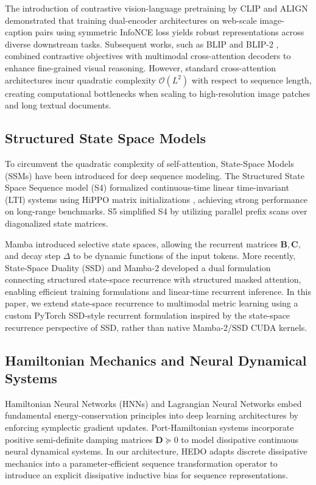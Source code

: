 \documentclass[journal]{IEEEtran}
\begin{document}
The introduction of contrastive vision-language pretraining by CLIP \cite{radford2021learning} and ALIGN \cite{jia2021scaling} demonstrated that training dual-encoder architectures on web-scale image-caption pairs using symmetric InfoNCE loss yields robust representations across diverse downstream tasks. Subsequent works, such as BLIP \cite{li2022blip} and BLIP-2 \cite{li2023blip2}, combined contrastive objectives with multimodal cross-attention decoders to enhance fine-grained visual reasoning. However, standard cross-attention architectures incur quadratic complexity $\mathcal{O}(L^2)$ with respect to sequence length, creating computational bottlenecks when scaling to high-resolution image patches and long textual documents.

\subsection{Structured State Space Models}
To circumvent the quadratic complexity of self-attention, State-Space Models (SSMs) have been introduced for deep sequence modeling. The Structured State Space Sequence model (S4) \cite{gu2021efficiently} formalized continuous-time linear time-invariant (LTI) systems using HiPPO matrix initializations \cite{gu2021efficiently}, achieving strong performance on long-range benchmarks. S5 \cite{smith2022simplified} simplified S4 by utilizing parallel prefix scans over diagonalized state matrices.

Mamba \cite{gu2023mamba} introduced selective state spaces, allowing the recurrent matrices $\mathbf{B}, \mathbf{C},$ and decay step $\Delta$ to be dynamic functions of the input tokens. More recently, State-Space Duality (SSD) and Mamba-2 \cite{dao2024transformers} developed a dual formulation connecting structured state-space recurrence with structured masked attention, enabling efficient training formulations and linear-time recurrent inference. In this paper, we extend state-space recurrence to multimodal metric learning using a custom PyTorch SSD-style recurrent formulation inspired by the state-space recurrence perspective of SSD, rather than native Mamba-2/SSD CUDA kernels.

\subsection{Hamiltonian Mechanics and Neural Dynamical Systems}
Hamiltonian Neural Networks (HNNs) \cite{greydanus2019hamiltonian} and Lagrangian Neural Networks \cite{cranmer2020lagrangian} embed fundamental energy-conservation principles into deep learning architectures by enforcing symplectic gradient updates. Port-Hamiltonian systems \cite{massaroli2019port} incorporate positive semi-definite damping matrices $\mathbf{D} \succeq 0$ to model dissipative continuous neural dynamical systems. In our architecture, HEDO adapts discrete dissipative mechanics into a parameter-efficient sequence transformation operator to introduce an explicit dissipative inductive bias for sequence representations.
\end{document}
